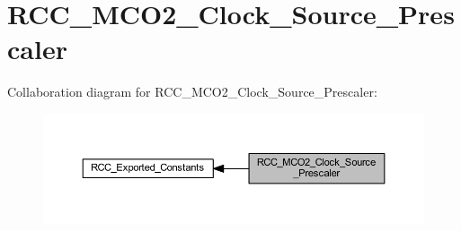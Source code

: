 \hypertarget{group___r_c_c___m_c_o2___clock___source___prescaler}{}\section{R\+C\+C\+\_\+\+M\+C\+O2\+\_\+\+Clock\+\_\+\+Source\+\_\+\+Prescaler}
\label{group___r_c_c___m_c_o2___clock___source___prescaler}
Collaboration diagram for R\+C\+C\+\_\+\+M\+C\+O2\+\_\+\+Clock\+\_\+\+Source\+\_\+\+Prescaler\+:\nopagebreak
\begin{figure}[H]
\begin{center}
\leavevmode
\includegraphics[width=350pt]{group___r_c_c___m_c_o2___clock___source___prescaler}
\end{center}
\end{figure}
